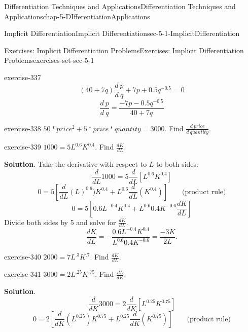 \documentclass[oneside,10pt,]{book}
\numberwithin{equation}{section}
\begin{document}
\begin{chapterptx}{Differentiation Techniques and Applications}{}{Differentiation Techniques and Applications}{}{}{chap-5-DIfferentiationApplications}
\begin{sectionptx}{Implicit Differentiation}{}{Implicit Differentiation}{}{}{sec-5-1-ImplicitDifferentiation}
\begin{exercises-subsection-numberless}{Exercises: Implicit Differentiation Problems}{}{Exercises: Implicit Differentiation Problems}{}{}{exercises-set-sec-5-1}
\begin{divisionexercise}{7}{}{}{exercise-337}
\begin{equation*}
(40+7q)\frac{d\ p}{d\ q}+7p+0.5 q^{-0.5}=0
\end{equation*}
%
\begin{equation*}
\frac{d\ p}{d\ q}=  \frac{-7p-0.5 q^{-0.5}}{40+7q}
\end{equation*}
\end{divisionexercise}%
\begin{divisionexercise}{8}{}{}{exercise-338}%
\hypertarget{p-1916}{}%
\(50*price^2+5*price*quantity=3000\).			Find \(\frac{d\ price}{d\ quantity}\).%
\end{divisionexercise}%
\begin{divisionexercise}{9}{}{}{exercise-339}%
\hypertarget{p-1917}{}%
\(1000=5L^{0.6} K^{0.4}\).	Find \(\frac{dK}{dL}\).%
\par\smallskip%
\noindent\textbf{Solution}.\hypertarget{solution-170}{}\quad%
\hypertarget{p-1918}{}%
Take the derivative with respect to \(L\) to both sides:%
%
\begin{equation*}
\frac{d}{dL} 1000=5 \frac{d}{dL} [L^{0.6} K^{0.4} ]
\end{equation*}
%
\begin{equation*}
0=5[\frac{d}{dL}(L)^{0.6})K^{0.4}+L^{0.6}  \frac{d}{dL}(K^{0.4})]  \qquad \text{(product rule)}
\end{equation*}
%
\begin{equation*}
0=5[0.6 L^{-0.4}  K^{0.4}+L^{0.6}  0.4K^{-0.6}  \frac{dK}{dL}]   
\end{equation*}
\hypertarget{p-1919}{}%
Divide both sides by 5 and solve for \(\frac{dK}{dL}\).%
%
\begin{equation*}
\frac{dK}{dL}=-  \frac{0.6 L^{-0.4}  K^{0.4}}{L^{0.6}  0.4K^{-0.6}}=
\frac{-3K}{2L}.
\end{equation*}
\end{divisionexercise}%
\begin{divisionexercise}{10}{}{}{exercise-340}%
\hypertarget{p-1920}{}%
\(2000=7L^.3 K^.7.\)	Find \(\frac{dK}{dL}\).%
\end{divisionexercise}%
\begin{divisionexercise}{11}{}{}{exercise-341}%
\hypertarget{p-1921}{}%
\(3000=2L^.25 K^.75\).	Find \(\frac{dL}{dK}\).%
\par\smallskip%
\noindent\textbf{Solution}.\hypertarget{solution-171}{}\quad%
%
\begin{equation*}
\frac{d}{dK} 3000=2 \frac{d}{dK} [L^{0.25} K^{0.75} ]
\end{equation*}
%
\begin{equation*}
0=2[\frac{d}{dK}( L^{0.25}) K^{0.75}+L^{0.25} \frac{d}{dK}( K^{0.75} )]   \qquad\text{(product rule)}

\end{equation*}
\end{divisionexercise}
\end{exercises-subsection-numberless}
\end{sectionptx}
\end{chapterptx}
\end{document}

